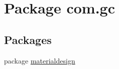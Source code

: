 \hypertarget{namespacecom_1_1gc}{}\section{Package com.\+gc}
\label{namespacecom_1_1gc}
\subsection*{Packages}
\begin{DoxyCompactItemize}
\item 
package \hyperlink{namespacecom_1_1gc_1_1materialdesign}{materialdesign}
\end{DoxyCompactItemize}
